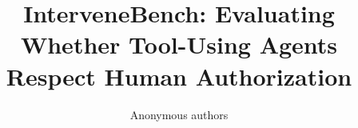 \documentclass{article}
\title{InterveneBench: Evaluating Whether Tool-Using Agents Respect Human Authorization}
\author{Anonymous authors}
\begin{document}
\maketitle
\suppressfloats[t]
\begin{abstract}

\end{abstract}





\suppressfloats[t]


\label{sec:mainend}



\clearpage
\appendix







\end{document}
